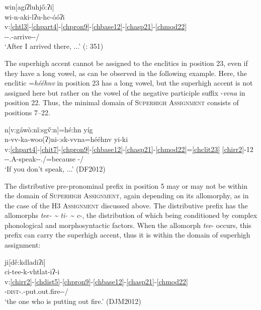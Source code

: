\documentclass[output=paper]{langscibook}
\begin{document}
\ea\label{bkm:Ref72235388}win[agíʔluhj\H{o}:ʔi] \\
\glll wi-n-aki-lʔu-hc-óóʔi\\
 v:\ref{chtl3}-\ref{chpart4}-\ref{chpron9}-\ref{chbase12}-\ref{chasp21}-\ref{chmod22}\\
\Trnsl{}-\Part{}-\First\Sg.\Barg{}-arrive-\Prf{}-\Hab{}/\Sh{} \\
\glt `After I arrived there, ...' (\citealt{PulteFeeling1975}: 351)
\z 
     
The superhigh accent cannot be assigned to the enclitics in position 23, even if they have a long vowel, as can be observed in the following example. Here, the enclitic =\textit{hééhnv} in position 23 has a long vowel, but the superhigh accent is not assigned here but rather on the vowel of the negative participle suffix -\textit{vvna} in position 22. Thus, the minimal domain of \textsc{Superhigh} \textsc{Assignment} consists of positions 7--22. 

\ea\label{ex:cher:key:29} {n[v:gáwò:nǐ:sg\H{v}:n]=hé:hn yíg} \\
\glll n-vv-ka-woo(ʔ)ni-:sk-vvna=hééhnv yi-ki\\
 v:\ref{chpart4}-\ref{chit7}-\ref{chpron9}-\ref{chbase12}-\ref{chasp21}-\ref{chmod22}=\ref{chclit23} \ref{chirr2}-12\\
\Part{}-\Iter{}-\Third{}\Sg{}.A-speak-\Impf{}-\Neg.\Pp{}/\Sh{}=because \Irr{}-\Cop/\Sh{}\\
\glt `If you don't speak, ...' (DF2012)
\z 
     
The distributive pre-pronominal prefix in position 5 may or may not be within the domain of \textsc{Superhigh} \textsc{Assignment}, again depending on its allomorphy, as in the case of the \textsc{H3} \textsc{Assignment} discussed above. The distributive prefix has the allomorphs \textit{tee- {\textasciitilde} ti- {\textasciitilde} c}{}-, the distribution of which being conditioned by complex phonological and morphosyntactic factors. When the allomorph \textit{tee}{}- occurs, this prefix can carry the superhigh accent, thus it is within the domain of superhigh assignment:

\ea\label{ex:cher:key:30} {ji[d\H{e}:kdladiʔi]} \\
\glll ci-tee-k-vhtlat-iʔ-i\\
v:\ref{chirr2}-\ref{chdist5}-\ref{chpron9}-\ref{chbase12}-\ref{chasp21}-\ref{chmod22}\\
\Rel{}-\textsc{dist}-\Third\Sg.\Aarg{}-put.out.fire-\Prs{}-\Nom/\Sh{}\\
\glt `the one who is putting out fire.' (DJM2012) 
\z 
\end{document}
